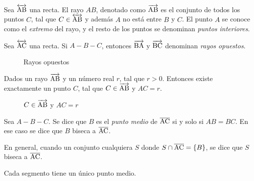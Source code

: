 \begin{definition}
    Sea $\overleftrightarrow{\rm AB}$ una recta. El rayo $AB$, denotado como $\overrightarrow{\rm AB}$ es el conjunto de todos los puntos $C$, tal que $C \in \overleftrightarrow{\rm AB}$ y además $A$ no está entre $B$ y $C$. El punto $A$ se conoce como el \textit{extremo} del rayo, y el resto de los puntos se denominan \textit{puntos interiores}.
\end{definition}

\clearpage

\begin{definition}
    Sea $\overleftrightarrow{\rm AC}$ una recta. Si $A-B-C$, entonces $\overrightarrow{\rm BA}$ y $\overrightarrow{\rm BC}$ denominan \textit{rayos opuestos}.

    \begin{figure}[h]
        \centering
        
        \caption{Rayos opuestos}
        \label{fig:plot1}
    \end{figure}
\end{definition}

\begin{postulate}
    Dados un rayo $\overrightarrow{\rm AB}$ y un número real $r$, tal que $r > 0$. Entonces existe exactamente un punto $C$, tal que $C \in \overrightarrow{\rm AB}$ y $AC = r$.

    \begin{figure}[h]
        \centering
        
        \caption{$C \in \overrightarrow{\rm AB}$ y $AC = r$}
        \label{fig:plot18}
    \end{figure}
    
\end{postulate}

\begin{definition}
    Sea $A-B-C$. Se dice que $B$ es el \textit{punto medio} de $\overline{\rm AC}$ si y solo si $AB = BC$. En ese caso se dice que $B$ biseca a $\overline{\rm AC}$.

    En general, cuando un conjunto cualquiera $S$ donde $S \cap \overline{\rm AC} = \{B\}$, se dice que $S$ biseca a $\overline{\rm AC}$.
\end{definition}

\begin{theorem}
    Cada segmento tiene un único punto medio.
\end{theorem}

